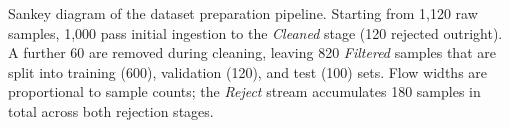 \caption{Sankey diagram of the dataset preparation pipeline. Starting from 1{,}120 raw samples, 1{,}000 pass initial ingestion to the \textit{Cleaned} stage (120 rejected outright). A further 60 are removed during cleaning, leaving 820 \textit{Filtered} samples that are split into training (600), validation (120), and test (100) sets. Flow widths are proportional to sample counts; the \textit{Reject} stream accumulates 180 samples in total across both rejection stages.}
